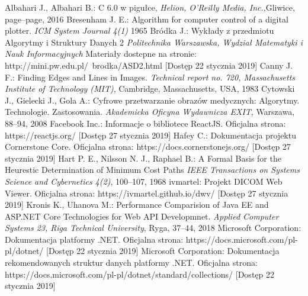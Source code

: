 \documentclass[a4paper,11pt,twoside,openright]{report}
\theoremstyle{definition}
\begin{document}
\begin{thebibliography}{24}%
{}



 Albahari J., Albahari B.: C 6.0 w pigułce, \emph{Helion, O'Reilly Media, Inc.},Gliwice, page--page, 2016
 Bresenham J. E.: Algorithm for computer control of a digital plotter. \emph{ICM System Journal 4(1)} 1965
 Bródka J.: Wykłady z przedmiotu Algorytmy i Struktury Danych 2 \emph{Politechnika Warszawska, Wydział Matematyki i Nauk Informacyjnych} Materiały dostepne na stronie: http://mini.pw.edu.pl/~brodka/ASD2.html [Dostęp 22 stycznia 2019]
 Canny J. F.: Finding Edges and Lines in Images. \emph{Technical report no. 720, Massachusetts Institute of Technology (MIT)}, Cambridge, Massachusetts, USA, 1983
 Cytowski J., Gielecki J., Gola A.: Cyfrowe przetwarzanie obrazów medycznych: Algorytmy. Technologie. Zastosowania. \emph{Akademicka Oficyna Wydawnicza EXIT}, Warszawa, 88--94, 2008
 Facebook Inc.: Informacje o bibliotece ReactJS. Oficjalna strona: https://reactjs.org/ [Dostęp 27 stycznia 2019]
  Hafey C.: Dokumentacja projektu Cornerstone Core. Oficjalna strona: https://docs.cornerstonejs.org/ [Dostęp 27 stycznia 2019]
 Hart P. E., Nilsson N. J., Raphael B.: A Formal Basis for the Heurestic Determination of Minimum Cost Paths \emph{IEEE Transactions on Systems Science and Cybernetics 4(2)}, 100--107, 1968
  ivmartel: Projekt DICOM Web Viewer. Oficjalna strona: https://ivmartel.github.io/dwv/ [Dostęp 27 stycznia 2019]
 Kronis K., Uhanova M.: Performance Comparision of Java EE and ASP.NET Core Technologies for Web API Developmnet. \emph{Applied Computer Systems 23, Riga Technical University}, Ryga, 37--44, 2018
 Microsoft Corporation: Dokumentacja platformy .NET. Oficjalna strona: https://docs.microsoft.com/pl-pl/dotnet/ [Dostęp 22 stycznia 2019]
 Microsoft Corporation: Dokumentacja rekomendowanych struktur danych platformy .NET. Oficjalna strona: https://docs.microsoft.com/pl-pl/dotnet/standard/collections/ [Dostęp 22 stycznia 2019]

\end{thebibliography}
\end{document}

